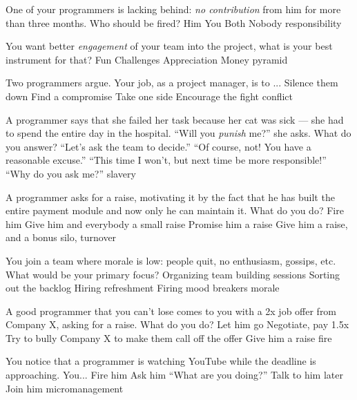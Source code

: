 \documentclass{article}
\begin{document}

\pmbaQuestion
  {One of your programmers is lacking behind: \emph{no contribution} from him for more than three months. Who should be fired?}
  {Him}
  {You}
  {Both}
  {Nobody}
  {responsibility}

\pmbaQuestion
  {You want better \emph{engagement} of your team into the project, what is your best instrument for that?}
  {Fun}
  {Challenges}
  {Appreciation}
  {Money}
  {pyramid}

\pmbaQuestion
  {Two programmers argue. Your job, as a project manager, is to ...}
  {Silence them down}
  {Find a compromise}
  {Take one side}
  {Encourage the fight}
  {conflict}

\pmbaQuestion
  {A programmer says that she failed her task because her cat was sick --- she had to spend the entire day in the hospital. ``Will you \emph{punish} me?'' she asks. What do you answer?}
  {``Let's ask the team to decide.''}
  {``Of course, not! You have a reasonable excuse.''}
  {``This time I won't, but next time be more responsible!''}
  {``Why do you ask me?''}
  {slavery}

\pmbaQuestion
  {A programmer asks for a raise, motivating it by the fact that he has built the entire payment module and now only he can maintain it. What do you do?}
  {Fire him}
  {Give him and everybody a small raise}
  {Promise him a raise}
  {Give him a raise, and a bonus}
  {silo, turnover}

\pmbaQuestion
  {You join a team where morale is low: people quit, no enthusiasm, gossips, etc. What would be your primary focus?}
  {Organizing team building sessions}
  {Sorting out the backlog}
  {Hiring refreshment}
  {Firing mood breakers}
  {morale}

\pmbaQuestion
  {A good programmer that you can't lose comes to you with a 2x job offer from Company X, asking for a raise. What do you do?}
  {Let him go}
  {Negotiate, pay 1.5x}
  {Try to bully Company X to make them call off the offer}
  {Give him a raise}
  {fire}

\pmbaQuestion
  {You notice that a programmer is watching YouTube while the deadline is approaching. You...}
  {Fire him}
  {Ask him ``What are you doing?''}
  {Talk to him later}
  {Join him}
  {micromanagement}

\end{document}
